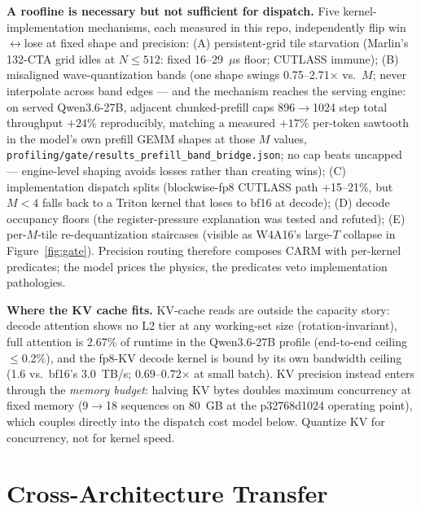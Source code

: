 \documentclass[10pt,twocolumn]{article}
\begin{document}
\textbf{A roofline is necessary but not sufficient for dispatch.}
Five kernel-implementation mechanisms, each measured in this repo, independently flip win$\leftrightarrow$lose at fixed shape and precision: (A) persistent-grid tile starvation (Marlin's 132-CTA grid idles at $N\!\leq\!512$: fixed 16--29~$\mu$s floor; CUTLASS immune); (B) misaligned wave-quantization bands (one shape swings 0.75--2.71$\times$ vs.\ $M$; never interpolate across band edges --- and the mechanism reaches the serving engine: on served Qwen3.6-27B, adjacent chunked-prefill caps 896$\to$1024 step total throughput $+24\%$ reproducibly, matching a measured $+17\%$ per-token sawtooth in the model's own prefill GEMM shapes at those $M$ values, \texttt{profiling/gate/results\_prefill\_band\_bridge.json}; no cap beats uncapped --- engine-level shaping avoids losses rather than creating wins); (C) implementation dispatch splits (blockwise-fp8 CUTLASS path +15--21\%, but $M{<}4$ falls back to a Triton kernel that loses to bf16 at decode); (D) decode occupancy floors (the register-pressure explanation was tested and refuted); (E) per-$M$-tile re-dequantization staircases (visible as W4A16's large-$T$ collapse in Figure~\ref{fig:gate}).  Precision routing therefore composes CARM with per-kernel predicates; the model prices the physics, the predicates veto implementation pathologies.

\textbf{Where the KV cache fits.}
KV-cache reads are outside the capacity story: decode attention shows no L2 tier at any working-set size (rotation-invariant), full attention is 2.67\% of runtime in the Qwen3.6-27B profile (end-to-end ceiling $\leq$0.2\%), and the fp8-KV decode kernel is bound by its own bandwidth ceiling (1.6 vs.\ bf16's 3.0~TB/s; 0.69--0.72$\times$ at small batch).  KV precision instead enters through the \emph{memory budget}: halving KV bytes doubles maximum concurrency at fixed memory (9$\to$18 sequences on 80~GB at the p32768d1024 operating point), which couples directly into the dispatch cost model below.  Quantize KV for concurrency, not for kernel speed.

\section{Cross-Architecture Transfer}
\label{sec:transfer}
\end{document}
